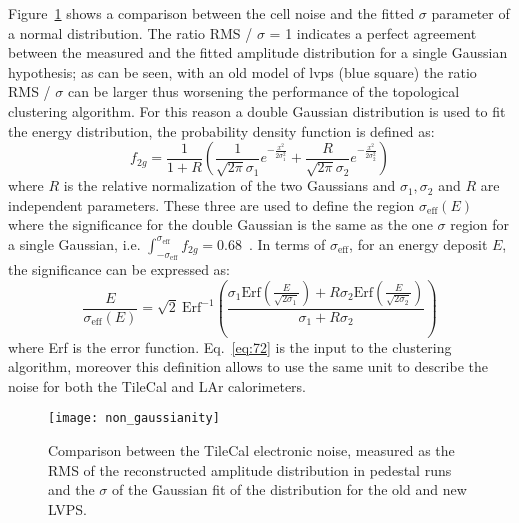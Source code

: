 Figure~\ref{fig:non_gaussianity} shows a comparison between the cell noise and
the fitted $\sigma$ parameter of a normal distribution. The ratio RMS / $\sigma$
= 1 indicates a perfect agreement between the measured and the fitted amplitude
distribution for a single Gaussian hypothesis; as can be seen, with an old model
of \gls{lvps} (blue square) the ratio RMS / $\sigma$ can be larger thus
worsening the performance of the topological clustering algorithm. For this
reason a double Gaussian distribution is used to fit the energy distribution,
the probability density function is defined as:
\begin{equation}
  \label{eq:71}
  f_{2g} = \frac{1}{1 + R} \left( \frac{1}{\sqrt{2 \pi} \sigma_1} e^{-
      \frac{x^2}{2 \sigma_1^2}} + \frac{R}{\sqrt{2 \pi} \sigma_2} e^{-
      \frac{x^2}{2 \sigma_2^2}} \right)
\end{equation}
where $R$ is the relative normalization of the two Gaussians and
$\sigma_1, \sigma_2$ and $R$ are independent parameters. These three are used to
define the region $\sigma_{\text{eff}}(E)$ where the significance for the double
Gaussian is the same as the one $\sigma$ region for a single Gaussian,
i.e.
$\int_{- \sigma_{\text{eff}}}^{\sigma_{\text{eff}}} f_{2g} =
0.68$~\cite{TileReadiness}.
In terms of $\sigma_{\text{eff}}$, for an energy deposit $E$, the significance
can be expressed as:
\begin{equation}
  \label{eq:72}
  \frac{E}{\sigma_{\text{eff}}(E)} = \sqrt{2}\ \text{Erf}^{- 1} \left( \frac{\sigma_1
      \text{Erf} \left(\frac{E}{\sqrt{2 \sigma_1}} \right) + R \sigma_2 \text{Erf}
    \left( \frac{E}{\sqrt{2 \sigma_2}} \right)}{\sigma_1 + R \sigma_2} \right)
\end{equation}
where Erf is the error function. Eq.~\eqref{eq:72} is the input to the
clustering algorithm, moreover this definition allows to use the same unit to
describe the noise for both the TileCal and LAr calorimeters.

\begin{figure}[!h]
  \centering
    \texttt{[image: non\_gaussianity]}
    \caption{Comparison between the TileCal electronic noise, measured as the
      RMS of the reconstructed amplitude distribution in pedestal runs and the
      $\sigma$ of the Gaussian fit of the distribution for the old and new LVPS.}
    \label{fig:non_gaussianity}
\end{figure}
